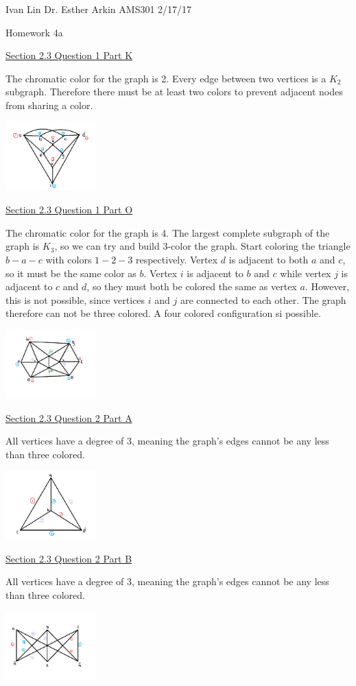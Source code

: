 \documentclass{article}
\begin{document}
Ivan Lin\newline{}
Dr. Esther Arkin\newline{}
AMS301\newline{}
2/17/17

\begin{center}
  Homework 4a
\end{center}

\underline{Section 2.3 Question 1 Part K}

The chromatic color for the graph is 2. Every edge between two vertices is a $K_2$ subgraph. Therefore there must be at least two colors to prevent adjacent nodes from sharing a color.

\includegraphics[height=100px]{hw3-1k.png}

\underline{Section 2.3 Question 1 Part O}

The chromatic color for the graph is 4. The largest complete subgraph of the graph is $K_3$, so we can try and build 3-color the graph. Start coloring the triangle $b-a-c$ with colors $1-2-3$ respectively. Vertex $d$ is adjacent to both $a$ and $c$, so it must be the same color as $b$. Vertex $i$ is adjacent to $b$ and $c$ while vertex $j$ is adjacent to $c$ and $d$, so they must both be colored the same as vertex $a$. However, this is not possible, since vertices $i$ and $j$ are connected to each other. The graph therefore can not be three colored. A four colored configuration si possible.

\includegraphics[height=100px]{hw3-1o.png}

\underline{Section 2.3 Question 2 Part A}

All vertices have a degree of 3, meaning the graph's edges cannot be any less than three colored.

\includegraphics[height=100px]{hw3-2a.png}

\underline{Section 2.3 Question 2 Part B}

All vertices have a degree of 3, meaning the graph's edges cannot be any less than three colored.

\includegraphics[height=100px]{hw3-2b.png}
\end{document}
